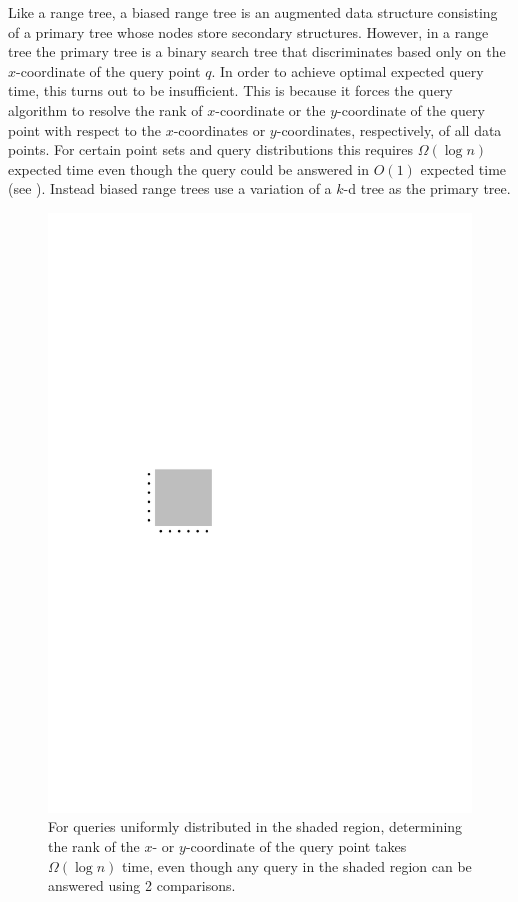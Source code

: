 \documentclass{patmorin}
\begin{document}
Like a range tree, a biased range tree is an augmented data structure
consisting of a primary tree whose nodes store secondary structures.
However, in a range tree the primary tree is a binary search tree that
discriminates based only on the $x$-coordinate of the query point $q$.
In order to achieve optimal expected query time, this turns out to be
insufficient.  This is because it forces the query algorithm to resolve
the rank of $x$-coordinate or the $y$-coordinate of the query point
with respect to the $x$-coordinates or $y$-coordinates, respectively,
of all data points. For certain point sets and query distributions this
requires $\Omega(\log n)$ expected time even though the query could
be answered in $O(1)$ expected time (see ).  Instead biased
range trees use a variation of a $k$-d tree as the primary tree.

\begin{figure}
  \begin{center}
    \includegraphics{xy}
  \end{center}
  \caption{For queries uniformly distributed in the shaded region,
  determining the rank of the $x$- or $y$-coordinate of the query point
  takes $\Omega(\log n)$ time, even though any query in the shaded region
  can be answered using 2 comparisons.}
\end{figure}
\end{document}
